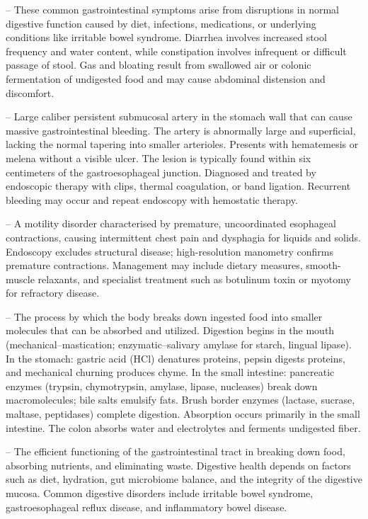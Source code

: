 -- These common gastrointestinal symptoms arise from disruptions in normal digestive function caused by diet, infections, medications, or underlying conditions like irritable bowel syndrome. Diarrhea involves increased stool frequency and water content, while constipation involves infrequent or difficult passage of stool. Gas and bloating result from swallowed air or colonic fermentation of undigested food and may cause abdominal distension and discomfort.

-- Large caliber persistent submucosal artery in the stomach wall that can cause massive gastrointestinal bleeding. The artery is abnormally large and superficial, lacking the normal tapering into smaller arterioles. Presents with hematemesis or melena without a visible ulcer. The lesion is typically found within six centimeters of the gastroesophageal junction. Diagnosed and treated by endoscopic therapy with clips, thermal coagulation, or band ligation. Recurrent bleeding may occur and repeat endoscopy with hemostatic therapy.

-- A motility disorder characterised by premature, uncoordinated esophageal contractions, causing intermittent chest pain and dysphagia for liquids and solids. Endoscopy excludes structural disease; high-resolution manometry confirms premature contractions. Management may include dietary measures, smooth-muscle relaxants, and specialist treatment such as botulinum toxin or myotomy for refractory disease.

-- The process by which the body breaks down ingested food into smaller molecules that can be absorbed and utilized. Digestion begins in the mouth (mechanical--mastication; enzymatic--salivary amylase for starch, lingual lipase). In the stomach: gastric acid (HCl) denatures proteins, pepsin digests proteins, and mechanical churning produces chyme. In the small intestine: pancreatic enzymes (trypsin, chymotrypsin, amylase, lipase, nucleases) break down macromolecules; bile salts emulsify fats. Brush border enzymes (lactase, sucrase, maltase, peptidases) complete digestion. Absorption occurs primarily in the small intestine. The colon absorbs water and electrolytes and ferments undigested fiber.

-- The efficient functioning of the gastrointestinal tract in breaking down food, absorbing nutrients, and eliminating waste. Digestive health depends on factors such as diet, hydration, gut microbiome balance, and the integrity of the digestive mucosa. Common digestive disorders include irritable bowel syndrome, gastroesophageal reflux disease, and inflammatory bowel disease.

